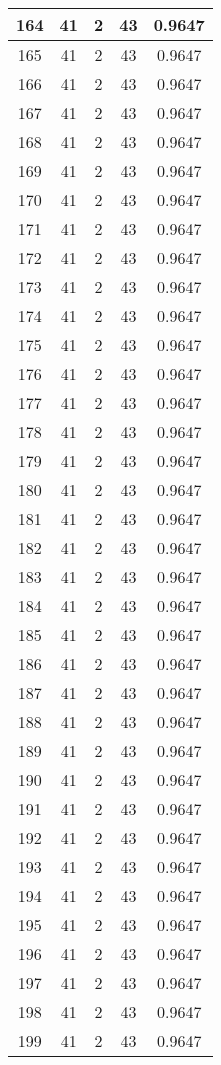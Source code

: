 \documentclass[letterpaper, 12pt]{article}
\begin{document}
\begin{longtable}{|c|c|c|c|c|}
\hline
164 & 41 & 2 & 43 & 0.9647 \\
\hline
165 & 41 & 2 & 43 & 0.9647 \\
\hline
166 & 41 & 2 & 43 & 0.9647 \\
\hline
167 & 41 & 2 & 43 & 0.9647 \\
\hline
168 & 41 & 2 & 43 & 0.9647 \\
\hline
169 & 41 & 2 & 43 & 0.9647 \\
\hline
170 & 41 & 2 & 43 & 0.9647 \\
\hline
171 & 41 & 2 & 43 & 0.9647 \\
\hline
172 & 41 & 2 & 43 & 0.9647 \\
\hline
173 & 41 & 2 & 43 & 0.9647 \\
\hline
174 & 41 & 2 & 43 & 0.9647 \\
\hline
175 & 41 & 2 & 43 & 0.9647 \\
\hline
176 & 41 & 2 & 43 & 0.9647 \\
\hline
177 & 41 & 2 & 43 & 0.9647 \\
\hline
178 & 41 & 2 & 43 & 0.9647 \\
\hline
179 & 41 & 2 & 43 & 0.9647 \\
\hline
180 & 41 & 2 & 43 & 0.9647 \\
\hline
181 & 41 & 2 & 43 & 0.9647 \\
\hline
182 & 41 & 2 & 43 & 0.9647 \\
\hline
183 & 41 & 2 & 43 & 0.9647 \\
\hline
184 & 41 & 2 & 43 & 0.9647 \\
\hline
185 & 41 & 2 & 43 & 0.9647 \\
\hline
186 & 41 & 2 & 43 & 0.9647 \\
\hline
187 & 41 & 2 & 43 & 0.9647 \\
\hline
188 & 41 & 2 & 43 & 0.9647 \\
\hline
189 & 41 & 2 & 43 & 0.9647 \\
\hline
190 & 41 & 2 & 43 & 0.9647 \\
\hline
191 & 41 & 2 & 43 & 0.9647 \\
\hline
192 & 41 & 2 & 43 & 0.9647 \\
\hline
193 & 41 & 2 & 43 & 0.9647 \\
\hline
194 & 41 & 2 & 43 & 0.9647 \\
\hline
195 & 41 & 2 & 43 & 0.9647 \\
\hline
196 & 41 & 2 & 43 & 0.9647 \\
\hline
197 & 41 & 2 & 43 & 0.9647 \\
\hline
198 & 41 & 2 & 43 & 0.9647 \\
\hline
199 & 41 & 2 & 43 & 0.9647 \\
\hline
\end{longtable}
\end{document}
